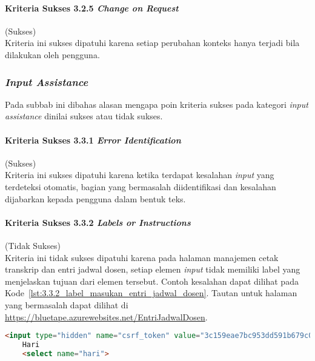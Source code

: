 \paragraph{Kriteria Sukses 3.2.5 \textit{Change on Request}}
\label{par:kepatuhan_bluetape_kriteria_sukses_3.2.5}
(Sukses)\\

Kriteria ini sukses dipatuhi karena setiap perubahan konteks hanya terjadi bila dilakukan oleh pengguna.

\subsubsection{\textit{Input Assistance}}
\label{subsubsec:kepatuhan_bluetape_input_assistance}
Pada subbab ini dibahas alasan mengapa poin kriteria sukses pada kategori \textit{input assistance} dinilai sukses atau tidak sukses.

\paragraph{Kriteria Sukses 3.3.1 \textit{Error Identification}}
\label{par:kepatuhan_bluetape_kriteria_sukses_3.3.1}
(Sukses)\\

Kriteria ini sukses dipatuhi karena ketika terdapat kesalahan \textit{input} yang terdeteksi otomatis, bagian yang bermasalah diidentifikasi dan kesalahan dijabarkan kepada pengguna dalam bentuk teks.

\paragraph{Kriteria Sukses 3.3.2 \textit{Labels or Instructions}}
\label{par:kepatuhan_bluetape_kriteria_sukses_3.3.2}
(Tidak Sukses)\\

Kriteria ini tidak sukses dipatuhi karena pada halaman manajemen cetak transkrip dan entri jadwal dosen, setiap elemen \textit{input} tidak memiliki label yang menjelaskan tujuan dari elemen tersebut. Contoh kesalahan dapat dilihat pada \mbox{Kode \ref{lst:3.3.2_label_masukan_entri_jadwal_dosen}}. Tautan untuk halaman yang bermasalah dapat dilihat di \url{https://bluetape.azurewebsites.net/EntriJadwalDosen}.

\begin{lstlisting}[frame=single, label={lst:3.3.2_label_masukan_entri_jadwal_dosen}, language=HTML, caption=Pelanggaran Kriteria Sukses 3.3.2 pada Halaman Entri Jadwal Dosen]
    <input type="hidden" name="csrf_token" value="3c159eae7bc953dd591b679c080ed066"/>
    Hari
    <select name="hari">
\end{lstlisting}

